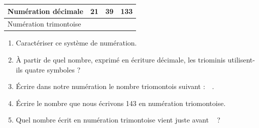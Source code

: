 \begin{exercice}
   \begin{center}
      {
      \begin{tabular}{|p{4cm}|C{2}|C{2}|C{2}|}
        \hline
         Numération décimale & 21 & 39 & 133 \\
         \hline
         Numération trimontoise & \,\, & \,\,\, & \,\,\,\,  \\
         \hline
      \end{tabular}}
   \end{center}
   \begin{enumerate}
      \item Caractériser ce système de numération.
      \item À partir de quel nombre, exprimé en écriture décimale, les triominis utilisent-ils quatre symboles ?
      \item Écrire dans notre numération le nombre triomontois suivant : \,\,\,\,.
      \item Écrire le nombre  que nous écrivons 143 en numération triomontoise.
      \item Quel nombre écrit en numération trimontoise vient juste avant \,\,\, ?
   \end{enumerate}
\end{exercice}

